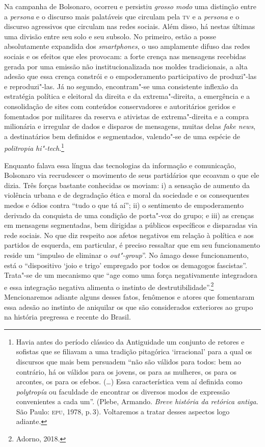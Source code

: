 Na campanha de Bolsonaro, ocorreu e persistiu \emph{grosso modo} uma
distinção entre a \emph{persona} e o discurso mais palatáveis que
circulam pela \textsc{tv} e a \emph{persona} e o discurso agressivos que circulam
nas redes sociais. Além disso, há nestas últimas uma divisão entre seu
solo e seu subsolo. No primeiro, estão a posse absolutamente expandida
dos \emph{smartphones}, o uso amplamente difuso das redes sociais e os
efeitos que eles provocam: a forte crença nas mensagens recebidas gerada
por uma emissão não institucionalizada nos moldes tradicionais, a alta
adesão que essa crença constrói e o empoderamento participativo de
produzi"-las e reproduzi"-las. Já no segundo, encontram"-se uma consistente
inflexão da estratégia política e eleitoral da direita e da
extrema"-direita, a emergência e a consolidação de sites com conteúdos
conservadores e autoritários geridos e fomentados por militares da
reserva e ativistas de extrema"-direita e a compra milionária e irregular
de dados e disparos de mensagens, muitas delas \emph{fake news}, a
destinatários bem definidos e segmentados, valendo"-se de uma espécie de
\emph{politropia hi"-tech}.\footnote{Havia antes do período clássico da
  Antiguidade um conjunto de retores e sofistas que se filiavam a uma
  tradição pitagórica `irracional' para a qual os discursos que mais bem
  persuadem ``não são válidos para todos: bem ao contrário, há os
  válidos para os jovens, os para as mulheres, os para os arcontes, os
  para os efebos. (\ldots{}) Essa característica vem aí definida como
  \emph{polytropía} ou faculdade de encontrar os diversos modos de
  expressão convenientes a cada um''. (Plebe, Armando. \emph{Breve
  história da retórica antiga}. São Paulo: \textsc{epu}, 1978, p.\,3). Voltaremos
  a tratar desses aspectos logo adiante.}

Enquanto falava essa língua das tecnologias da informação e comunicação,
Bolsonaro via recrudescer o movimento de seus partidários que ecoavam o
que ele dizia. Três forças bastante conhecidas os moviam: i) a sensação
de aumento da violência urbana e de degradação ética e moral da
sociedade e os consequentes medos e ódios contra ``tudo o que tá aí'';
ii) o sentimento de empoderamento derivado da conquista de uma condição
de porta"-voz do grupo; e iii) as crenças em mensagens segmentadas, bem
dirigidas a públicos específicos e disparadas via rede sociais. No que
diz respeito aos afetos negativos em relação à política e aos partidos
de esquerda, em particular, é preciso ressaltar que em seu funcionamento
reside um ``impulso de eliminar o \emph{out"-group}''. No âmago desse
funcionamento, está o ``dispositivo `joio e trigo' empregado por todos
os demagogos fascistas''. Trata"-se de um mecanismo que ``age como uma
força negativamente integradora e essa integração negativa alimenta o
instinto de destrutibilidade''.\footnote{Adorno, 2018.} Mencionaremos
adiante alguns desses fatos, fenômenos e atores que fomentaram essa
adesão ao instinto de aniquilar os que são considerados exteriores ao
grupo na história pregressa e recente do Brasil.

